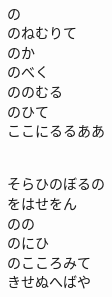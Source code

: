 \documentclass[10pt,b5j]{tarticle} %
\begin{document}
\begin{enumerate}
\begin{minipage}[c]{\blocksize}
    \end{minipage}
    \begin{minipage}[c]{\blocksize}
        
        \vspace{\linespace}
        \item~\\
        の\\
        のねむりて\\
        のか\\
        のべく\\
        ののむる\\
        のひて\\
        ここにるるああ
        
    \end{minipage}
    \begin{minipage}[c]{\blocksize}
        
        \vspace{\linespace}
        \item~\\
        そらひのぼるの\\
        をはせをん\\
        のの\\
        のにひ\\
        のこころみて\\
        きせぬへばや
    
    \end{minipage}
\end{enumerate} %
\end{document}
